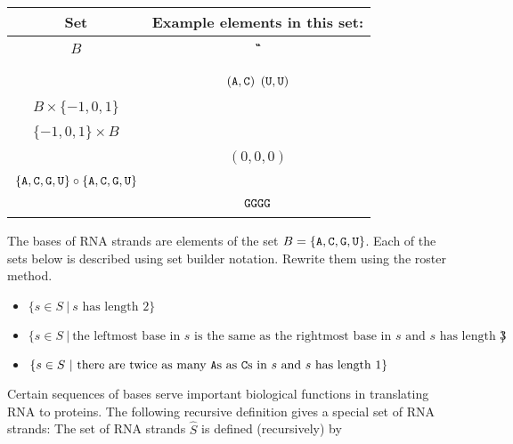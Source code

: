 \documentclass[12pt, oneside]{article}
\begin{document}
\begin{center}
\begin{tabular}{cc}
{\bf  Set} & {\bf Example elements in this set}:\\
\hline 
$B$ &\A \qquad \C \qquad \G \qquad \U \\
& \\
\hline
\phantom{$B \times B$} & $(\texttt{A}, \texttt{C})$ \qquad $(\texttt{U}, \texttt{U})$\\
& \\
\hline
$B \times \{-1,0,1\}$ & \\
& \\
\hline
$\{-1,0,1\} \times B$ & \\
& \\
\hline
\phantom{$\{-1,0,1\} \times \{-1,0,1\}  \times \{-1,0,1\} $} & \qquad $(0,0,0)$ \\
& \\
\hline
$ \{\texttt{A}, \texttt{C}, \texttt{G}, \texttt{U} \} \circ  \{\texttt{A}, \texttt{C}, \texttt{G}, \texttt{U} \}$& \\
& \\
\hline
\phantom{$\{G\} \circ \{G\} \circ \{G\}$} & \qquad $\texttt{G}\texttt{G}\texttt{G}\texttt{G}$ \\
& \\
\hline

\end{tabular}
\end{center}

\vfill
\vfill
\newpage

 The bases of RNA strands are elements of the set $B = \{\texttt{A}, \texttt{C}, \texttt{G}, \texttt{U} \}$. 
Each of the sets below is described using set builder notation. Rewrite them using the roster method. 
\begin{itemize}
\item $\{s \in S ~|~ s \text{ has length $2$} \}$ 

\vfill

\item $\{s \in S ~|~ \text{the leftmost base in $s$ is the same as the rightmost base in $s$ and 
$s$ has length $3$} \}$ 

\vfill

\item $\{s \in S ~|~ \text{there are twice as many $\texttt{A}$s as $\texttt{C}$s in $s$ and $s$ has length $1$} \}$ 

\vfill

\end{itemize}

Certain 
 sequences of bases serve important biological functions in translating RNA to proteins. The following
 recursive definition gives a special set of RNA strands: The set of RNA strands $\hat{S}$ is defined (recursively)
 by 
 
\end{document}
